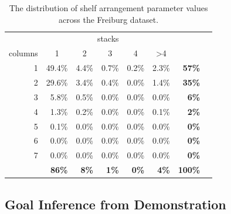 \begin{table}[h]
	\centering
	\caption{The distribution of shelf arrangement parameter values across the Freiburg dataset.}
	\label{tab:data-analysis}
	\begin{tabular}{r|rrrrrrr}
		\multicolumn{1}{l}{} & \multicolumn{5}{c}{stacks} & \multicolumn{1}{l}{} \\
		columns & \multicolumn{1}{c}{1} & \multicolumn{1}{c}{2} & \multicolumn{1}{c}{3} & \multicolumn{1}{c}{4} & \multicolumn{1}{c}{\textgreater4} & \multicolumn{1}{l}{\textbf{}} \\ \hline
		1 & 49.4\% & 4.4\% & 0.7\% & 0.2\% & 2.3\% & \textbf{57\%} \\
		2 & 29.6\% & 3.4\% & 0.4\% & 0.0\% & 1.4\% & \textbf{35\%} \\
		3 & 5.8\% & 0.5\% & 0.0\% & 0.0\% & 0.0\% & \textbf{6\%} \\
		4 & 1.3\% & 0.2\% & 0.0\% & 0.0\% & 0.1\% & \textbf{2\%} \\
		5 & 0.1\% & 0.0\% & 0.0\% & 0.0\% & 0.0\% & \textbf{0\%} \\
		6 & 0.0\% & 0.0\% & 0.0\% & 0.0\% & 0.0\% & \textbf{0\%} \\
		7 & 0.0\% & 0.0\% & 0.0\% & 0.0\% & 0.0\% & \textbf{0\%} \\
		& \textbf{86\%} & \textbf{8\%} & \textbf{1\%} & \textbf{0\%} & \textbf{4\%} & \textbf{100\%}
	\end{tabular}
\end{table}



\subsection{Goal Inference from Demonstration}
\label{sec:irosinference}

